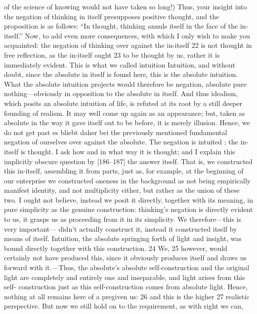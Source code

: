 of the science of knowing would not have taken so long!) Thus, your insight
into the negation of thinking in itself presupposes positive thought, and the
proposition is as follows: “In thought, thinking annuls itself in the face of the
in-itself.”
Now, to add even more consequences, with which I only wish to
make you acquainted: the negation of thinking over against the in-itself 22
is not thought in free reflection, as the in-itself ought 23 to be thought by us,
rather it is immediately evident. This is what we called intuition {Intuition},
and without doubt, since the absolute in itself is found here, this is the
absolute intuition. What the absolute intuition projects would therefore be
negation, absolute pure nothing—obviously in opposition to the absolute in
itself. And thus idealism, which posits an absolute intuition of life, is
refuted at its root by a still deeper founding of realism. It may well come up
again as an appearance; but, taken as absolute in the way it gave itself out
to be before, it is merely illusion. Hence, we do not get past {es bliebt daher
bei} the previously mentioned fundamental negation of ourselves over
against the absolute.
The negation is intuited ; the in-itself is thought. I ask how and in what
way it is thought; and I explain this implicitly obscure question by [186–187]
the answer itself. That is, we constructed this in-itself, assembling it from
parts, just as, for example, at the beginning of our enterprise we constructed
oneness in the background as not being empirically manifest identity, and not
multiplicity either, but rather as the union of these two. I ought not believe,
instead we posit it directly, together with its meaning, in pure simplicity as the
genuine construction: thinking’s negation is directly evident to us, it grasps us
as proceeding from it in its simplicity. We therefore—this is very important—
didn’t actually construct it, instead it constructed itself by means of itself.
Intuition, the absolute springing forth of light and insight, was bound
directly together with this construction. 24 We, 25 however, would certainly not
have produced this, since it obviously produces itself and draws us forward
with it.—Thus, the absolute’s absolute self-construction and the original light
are completely and entirely one and inseparable, and light arises from this self-
construction just as this self-construction comes from absolute light. Hence,
nothing at all remains here of a pregiven us: 26 and this is the higher 27 realistic
perspective. But now we still hold on to the requirement, as with right we can,
